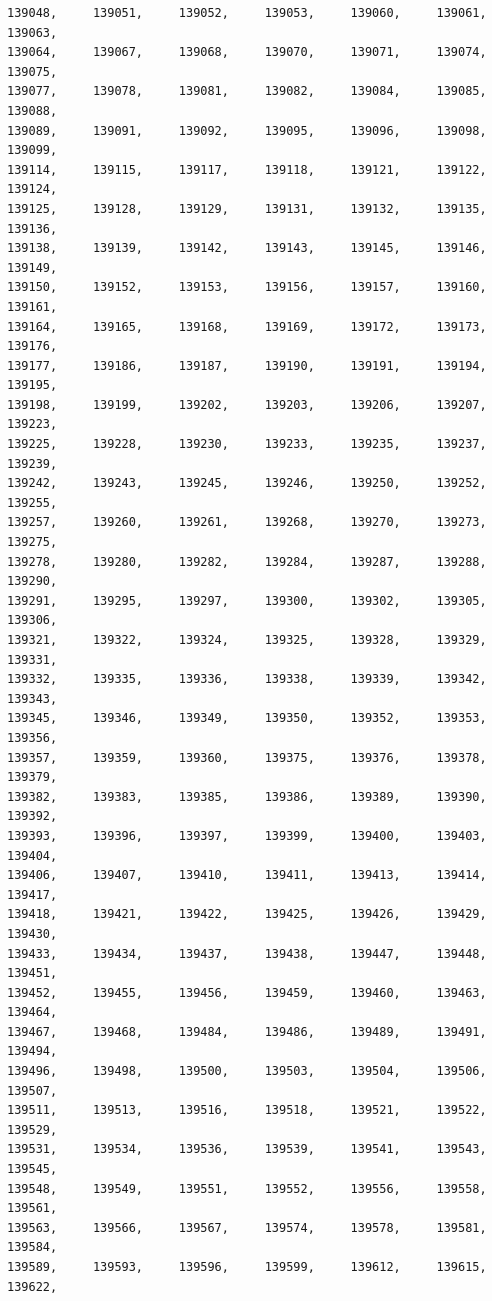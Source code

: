 \documentclass[a4paper,11pt]{report}
\begin{document}
\begin{verbatim}
139048,     139051,     139052,     139053,     139060,     139061,     139063,
139064,     139067,     139068,     139070,     139071,     139074,     139075,
139077,     139078,     139081,     139082,     139084,     139085,     139088,
139089,     139091,     139092,     139095,     139096,     139098,     139099,
139114,     139115,     139117,     139118,     139121,     139122,     139124,
139125,     139128,     139129,     139131,     139132,     139135,     139136,
139138,     139139,     139142,     139143,     139145,     139146,     139149,
139150,     139152,     139153,     139156,     139157,     139160,     139161,
139164,     139165,     139168,     139169,     139172,     139173,     139176,
139177,     139186,     139187,     139190,     139191,     139194,     139195,
139198,     139199,     139202,     139203,     139206,     139207,     139223,
139225,     139228,     139230,     139233,     139235,     139237,     139239,
139242,     139243,     139245,     139246,     139250,     139252,     139255,
139257,     139260,     139261,     139268,     139270,     139273,     139275,
139278,     139280,     139282,     139284,     139287,     139288,     139290,
139291,     139295,     139297,     139300,     139302,     139305,     139306,
139321,     139322,     139324,     139325,     139328,     139329,     139331,
139332,     139335,     139336,     139338,     139339,     139342,     139343,
139345,     139346,     139349,     139350,     139352,     139353,     139356,
139357,     139359,     139360,     139375,     139376,     139378,     139379,
139382,     139383,     139385,     139386,     139389,     139390,     139392,
139393,     139396,     139397,     139399,     139400,     139403,     139404,
139406,     139407,     139410,     139411,     139413,     139414,     139417,
139418,     139421,     139422,     139425,     139426,     139429,     139430,
139433,     139434,     139437,     139438,     139447,     139448,     139451,
139452,     139455,     139456,     139459,     139460,     139463,     139464,
139467,     139468,     139484,     139486,     139489,     139491,     139494,
139496,     139498,     139500,     139503,     139504,     139506,     139507,
139511,     139513,     139516,     139518,     139521,     139522,     139529,
139531,     139534,     139536,     139539,     139541,     139543,     139545,
139548,     139549,     139551,     139552,     139556,     139558,     139561,
139563,     139566,     139567,     139574,     139578,     139581,     139584,
139589,     139593,     139596,     139599,     139612,     139615,     139622,

\end{verbatim}
\end{document}
